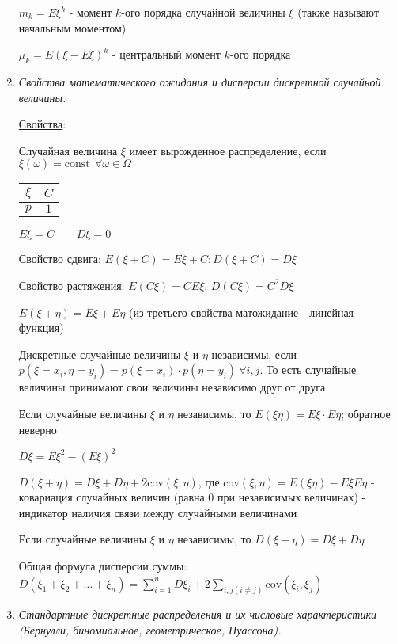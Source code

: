 \begin{enumerate}
    $m_k = E\xi^k$ - момент $k$-ого порядка случайной величины $\xi$ (также называют начальным моментом)

    $\mu_k = E(\xi - E\xi)^k$ - центральный момент $k$-ого порядка

    \item \textit{Свойства математического ожидания и дисперсии дискретной случайной величины.}

    \hyperlink{expectedvalueandvarianceproperties}{Свойства}: 

     Случайная величина $\xi$ имеет вырожденное распределение, если $\xi(\omega) = \mathrm{const} \ \ \forall \omega \in \Omega$

    \begin{tabular}{c|c}
        $\xi$ & $C$ \\
        \hline
        $p$   & $1$
    \end{tabular}

    $E\xi = C \qquad D\xi = 0$

     Свойство сдвига: $E(\xi + C) = E\xi + C; D (\xi + C) = D\xi$

     Свойство растяжения: $E(C\xi) = CE\xi$, $D(C\xi) = C^2 D\xi$

     $E(\xi + \eta) = E\xi + E\eta$ (из третьего свойства матожидание - линейная функция)

    \Def Дискретные случайные величины $\xi$ и $\eta$ независимы, если $p(\xi = x_i, \eta = y_i) = p(\xi = x_i) \cdot p(\eta = y_i) \ \forall i, j$.
    То есть случайные величины принимают свои величины независимо друг от друга

     Если случайные величины $\xi$ и $\eta$ независимы, то $E(\xi \eta) = E\xi \cdot E\eta$; обратное неверно

     $D\xi = E\xi^2 - (E\xi)^2$

    \Def $D(\xi + \eta) = D\xi + D\eta + 2\mathrm{cov} (\xi, \eta)$,
    где $\mathrm{cov}(\xi, \eta) = E(\xi\eta) - E\xi E\eta$ - ковариация случайных величин (равна 0 при независимых величинах) - индикатор наличия связи между случайными величинами

     Если случайные величины $\xi$ и $\eta$ независимы, то $D(\xi + \eta) = D\xi + D\eta$

     Общая формула дисперсии суммы: $D(\xi_1 + \xi_2 + \dots + \xi_n) = \sum_{i = 1}^n D \xi_i + 2\sum_{i, j (i \neq j)} \mathrm{cov} (\xi_i, \xi_j)$

    \item \textit{Стандартные дискретные распределения и их числовые характеристики (Бернулли, биномиальное, геометрическое, Пуассона).}
    

\end{enumerate}
